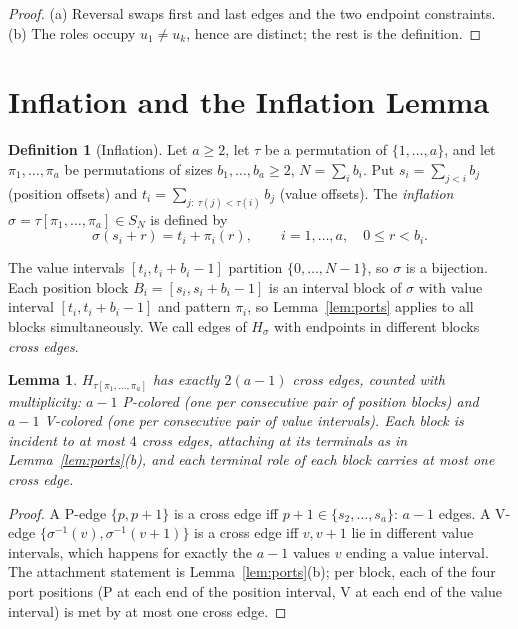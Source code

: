 \documentclass[11pt]{article}
\newtheorem{lemma}[theorem]{Lemma}
\theoremstyle{definition}
\newtheorem{definition}[theorem]{Definition}
\newcommand{\inv}[1]{#1^{-1}}
\begin{document}
\begin{proof}
(a) Reversal swaps first and last edges and the two endpoint constraints. (b) The
roles occupy $u_1 \ne u_k$, hence are distinct; the rest is the definition.
\end{proof}

\section{Inflation and the Inflation Lemma}\label{sec:inflation}

\begin{definition}[Inflation]\label{def:inflation}
Let $a \ge 2$, let $\tau$ be a permutation of $\{1, \dots, a\}$, and let
$\pi_1, \dots, \pi_a$ be permutations of sizes $b_1, \dots, b_a \ge 2$,
$N = \sum_i b_i$. Put $s_i = \sum_{j < i} b_j$ (position offsets) and
$t_i = \sum_{j:\ \tau(j) < \tau(i)} b_j$ (value offsets). The
\emph{inflation} $\sigma = \tau[\pi_1, \dots, \pi_a] \in S_N$ is defined by
\[
\sigma(s_i + r) = t_i + \pi_i(r), \qquad i = 1, \dots, a,\quad 0 \le r < b_i .
\]
\end{definition}

The value intervals $[t_i, t_i + b_i - 1]$ partition $\{0, \dots, N-1\}$, so $\sigma$
is a bijection. Each position block $B_i = [s_i, s_i + b_i - 1]$ is an interval block
of $\sigma$ with value interval $[t_i, t_i + b_i - 1]$ and pattern $\pi_i$, so
Lemma~\ref{lem:ports} applies to all blocks simultaneously. We call edges of
$H_\sigma$ with endpoints in different blocks \emph{cross edges}.

\begin{lemma}\label{lem:crosscount}
$H_{\tau[\pi_1,\dots,\pi_a]}$ has exactly $2(a-1)$ cross edges, counted with
multiplicity: $a-1$ P-colored (one per consecutive pair of position blocks) and
$a-1$ V-colored (one per consecutive pair of value intervals). Each block is incident
to at most $4$ cross edges, attaching at its terminals as in
Lemma~\ref{lem:ports}(b), and each terminal role of each block carries at most one
cross edge.
\end{lemma}

\begin{proof}
A P-edge $\{p, p+1\}$ is a cross edge iff $p+1 \in \{s_2, \dots, s_a\}$: $a-1$ edges.
A V-edge $\{\inv\sigma(v), \inv\sigma(v+1)\}$ is a cross edge iff $v, v+1$ lie in
different value intervals, which happens for exactly the $a-1$ values $v$ ending a
value interval. The attachment statement is Lemma~\ref{lem:ports}(b); per block, each
of the four port positions (P at each end of the position interval, V at each end of
the value interval) is met by at most one cross edge.
\end{proof}
\end{document}
